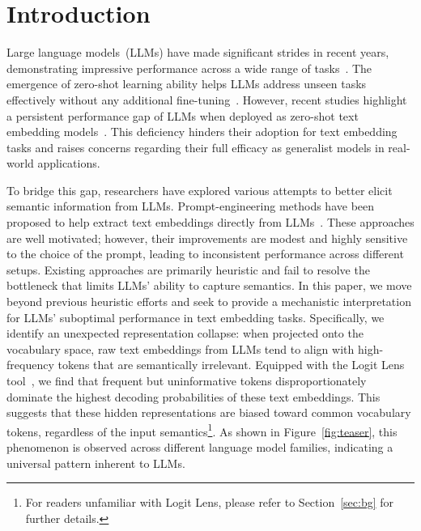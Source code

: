 \documentclass[sigconf]{acmart}
\begin{document}



\maketitle

\section{Introduction}
\label{sec:intro}
Large language models~(LLMs) have made significant strides in recent years, demonstrating impressive performance across a wide range of tasks~\cite{r1,llama3,qwen2.5}.
The emergence of zero-shot learning ability helps LLMs address unseen tasks effectively without any additional fine-tuning~\cite{scaling}.
However, recent studies highlight a persistent performance gap of LLMs when deployed as zero-shot text embedding models~\cite{prompteol,moee,llm2vec}.
This deficiency hinders their adoption for text embedding tasks and raises concerns regarding their full efficacy as generalist models in real-world applications.

To bridge this gap, researchers have explored various attempts to better elicit semantic information from LLMs.
Prompt-engineering methods have been proposed to help extract text embeddings directly from LLMs~\cite{prompteol,echo,metaeol,geneol}.
These approaches are well motivated; however, their improvements are modest and highly sensitive to the choice of the prompt, leading to inconsistent performance across different setups.
Existing approaches are primarily heuristic and fail to resolve the bottleneck that limits LLMs’ ability to capture semantics.
In this paper, we move beyond previous heuristic efforts and seek to provide a mechanistic interpretation for LLMs' suboptimal performance in text embedding tasks. 
Specifically, we identify an unexpected representation collapse: when projected onto the vocabulary space, raw text embeddings from LLMs tend to align with high-frequency tokens that are semantically irrelevant.
Equipped with the Logit Lens tool~\cite{logitlens}, we find that frequent but uninformative tokens disproportionately dominate the highest decoding probabilities of these text embeddings.
This suggests that these hidden representations are biased toward common vocabulary tokens, regardless of the input semantics\footnote{For readers unfamiliar with Logit Lens, please refer to Section~\ref{sec:bg} for further details.}.
As shown in Figure~\ref{fig:teaser}, this phenomenon is observed across different language model families, indicating a universal pattern inherent to LLMs.
\end{document}
